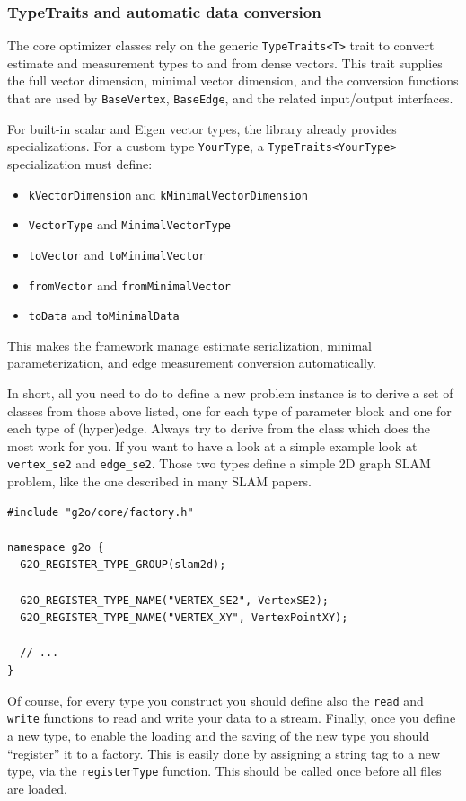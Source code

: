 \documentclass[a4paper]{article}
\begin{document}
\subsubsection{TypeTraits and automatic data conversion}
The core optimizer classes rely on the generic \verb+TypeTraits<T>+
trait to convert estimate and measurement types to and from dense
vectors. This trait supplies the full vector dimension,
minimal vector dimension, and the conversion functions that are used by
\verb+BaseVertex+, \verb+BaseEdge+, and the related input/output
interfaces.

For built-in scalar and Eigen vector types, the library already provides
specializations. For a custom type \verb+YourType+, a
\verb+TypeTraits<YourType>+ specialization must define:
\begin{itemize}
\item \verb+kVectorDimension+ and \verb+kMinimalVectorDimension+
\item \verb+VectorType+ and \verb+MinimalVectorType+
\item \verb+toVector+ and \verb+toMinimalVector+
\item \verb+fromVector+ and \verb+fromMinimalVector+
\item \verb+toData+ and \verb+toMinimalData+
\end{itemize}
This makes the framework manage estimate serialization, minimal
parameterization, and edge measurement conversion automatically.

In short, all you need to do to define a new problem instance is to
derive a set of classes from those above listed, one for each type of
parameter block and one for each type of (hyper)edge. Always try to
derive from the class which does the most work for you.  If you want to
have a look at a simple example look at \verb+vertex_se2+ and
\verb+edge_se2+. Those two types define a simple 2D graph SLAM
problem, like the one described in many SLAM papers.

\begin{lstlisting}[float,label=lst:inittypes,caption=Registering types
  by a constructor from a library]
#include "g2o/core/factory.h"

namespace g2o {
  G2O_REGISTER_TYPE_GROUP(slam2d);

  G2O_REGISTER_TYPE_NAME("VERTEX_SE2", VertexSE2);
  G2O_REGISTER_TYPE_NAME("VERTEX_XY", VertexPointXY);

  // ...
}
\end{lstlisting}

Of course, for every type you construct you should define also the
\verb+read+ and \verb+write+ functions to read and write your data to a
stream.  Finally, once you define a new type, to enable the loading and
the saving of the new type you should ``register'' it to a factory.
This is easily done by assigning a string tag to a new type, via the
\verb+registerType+ function. This should be called once before
all files are loaded.
\end{document}
